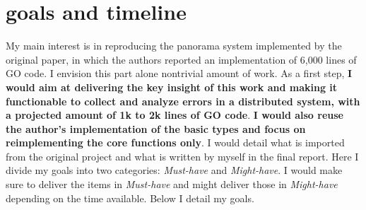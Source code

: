 \section{goals and timeline}
My main interest is in reproducing the panorama system implemented by the original paper, in which the authors reported an implementation of 6,000 lines of GO code. I envision this part alone nontrivial amount of work. As a first step, \textbf{I would aim at delivering the key insight of this work and making it functionable to collect and analyze errors in a distributed system, with a projected amount of 1k to 2k lines of GO code}. \textbf{I would also reuse the author's implementation of the basic types and focus on reimplementing the core functions only}. I would detail what is imported from the original project and what is written by myself in the final report. 
Here I divide my goals into two categories: \textit{Must-have} and \textit{Might-have}. I would make sure to deliver the items in \textit{Must-have} and might deliver those in \textit{Might-have} depending on the time available. Below I detail my goals.
